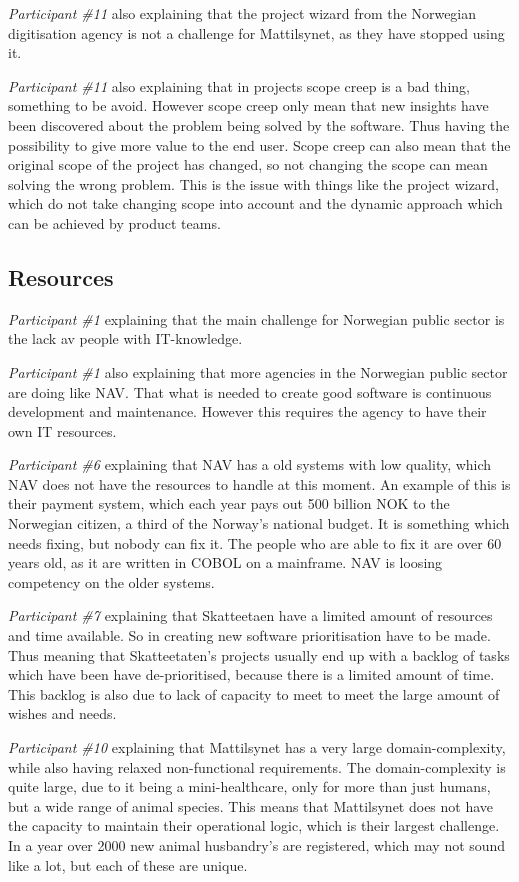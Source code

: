 \textit{Participant \#11} also explaining that the project wizard from the Norwegian digitisation agency is not a challenge for Mattilsynet, as they have stopped using it.

\textit{Participant \#11} also explaining that in projects scope creep is a bad thing, something to be avoid. However scope creep only mean that new insights have been discovered about the problem being solved by the software. Thus having the possibility to give more value to the end user. Scope creep can also mean that the original scope of the project has changed, so not changing the scope can mean solving the wrong problem. This is the issue with things like the project wizard, which do not take changing scope into account and the dynamic approach which can be achieved by product teams.

\subsection{Resources}
\textit{Participant \#1} explaining that the main challenge for Norwegian public sector is the lack av people with IT-knowledge.

\textit{Participant \#1} also explaining that more agencies in the Norwegian public sector are doing like NAV. That what is needed to create good software is continuous development and maintenance. However this requires the agency to have their own IT resources.

\textit{Participant \#6} explaining that NAV has a old systems with low quality, which NAV does not have the resources to handle at this moment. An example of this is their payment system, which each year pays out 500 billion NOK to the Norwegian citizen, a third of the Norway's national budget. It is something which needs fixing, but nobody can fix it. The people who are able to fix it are over 60 years old, as it are written in COBOL on a mainframe. NAV is loosing competency on the older systems.

\textit{Participant \#7} explaining that Skatteetaen have a limited amount of resources and time available. So in creating new software prioritisation have to be made. Thus meaning that Skatteetaten's projects usually end up with a backlog of tasks which have been have de-prioritised, because there is a limited amount of time. This backlog is also due to lack of capacity to meet to meet the large amount of wishes and needs.

\textit{Participant \#10} explaining that Mattilsynet has a very large domain-complexity, while also having relaxed non-functional requirements. The domain-complexity is quite large, due to it being a mini-healthcare, only for more than just humans, but a wide range of animal species. This means that Mattilsynet does not have the capacity to maintain their operational logic, which is their largest challenge. In a year over 2000 new animal husbandry's are registered, which may not sound like a lot, but each of these are unique.

